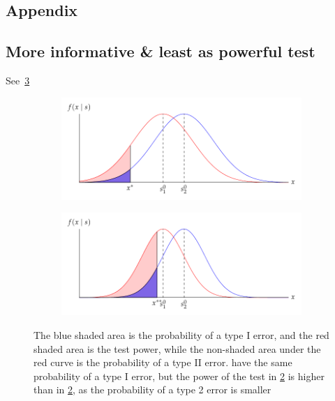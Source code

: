 \documentclass[10pt,a4paper]{article} 					%
\begin{document}
\begin{appendices}
\section{Appendix}
\subsection{More informative \& least as powerful test}\label{app:test-power}

See~\cref{fig:test-power}

\begin{figure}[!ht]
	   \centering
    \begin{subfigure}[b]{\textwidth}
		\includegraphics[width=\textwidth]{../fig/test-power-1.pdf}
		\caption{}\label{fig:test-power-1}
	\end{subfigure}
    \begin{subfigure}[b]{\textwidth}
		\includegraphics[width=\textwidth]{../fig/test-power-2.pdf}
		\caption{}\label{fig:test-power-2}
	\end{subfigure}
\caption{The blue shaded area is the probability of a type I error, and the red shaded area is the test power, while the non-shaded area under the red curve is the probability of a type II error.  have the same probability of a type I error, but the power of the test in \cref{fig:test-power-2} is higher than in \cref{fig:test-power-2}, as the probability of a type 2 error is smaller}\label{fig:test-power}
\end{figure}


\end{appendices}
\end{document}
